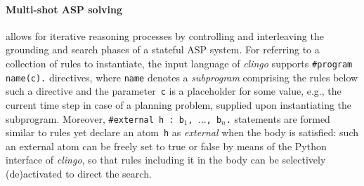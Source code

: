 \documentclass{tlp} %
\newcommand{\clingo}{\emph{clingo}\xspace}
\begin{document}
\paragraph{Multi-shot ASP solving} \citep{gekakasc17a}
allows for iterative reasoning processes by controlling and interleaving
the grounding and search phases of a stateful ASP system.
For referring to a collection of rules to instantiate,
the input language of \clingo supports \lstinline{#program name(c).}
directives, where \lstinline{name} denotes a \emph{subprogram} comprising
the rules below such a directive and the parameter~\lstinline{c} is a
placeholder for some value, e.g., the current time step in case of a
planning problem, supplied upon instantiating the subprogram.
Moreover, \lstinline{#external h : b}$_1$\lstinline{, }$\dots$\lstinline{, b}$_n$\lstinline{.}
statements are formed similar to rules yet declare an atom~\lstinline{h} as
\emph{external} when the body is satisfied:
such an external atom can be freely set to true or false by means of the
Python interface of \clingo,
so that rules including it in the body can be selectively (de)activated
to direct the search.
%
\end{document}
